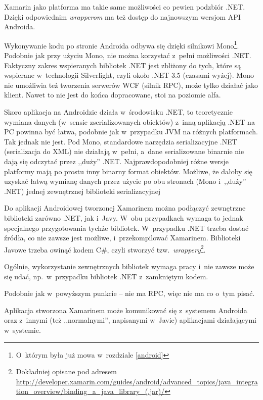 \begin{description}
Xamarin jako platforma ma takie same możliwości co pewien podzbiór .NET\@. Dzięki odpowiednim \emph{wrapperom} ma też dostęp do najnowszym wersjom API Androida.

Wykonywanie kodu po stronie Androida odbywa się dzięki silnikowi Mono\footnote{O~którym była już mowa w~rozdziale \ref{android}}\cite{xamarin-android-arch}.
Podobnie jak przy użyciu Mono\cite{mono-compatibility}, nie można korzystać z~pełni możliwości .NET\cite{xamarin-dot-net}.
Faktyczny zakres wspieranych bibliotek .NET jest zbliżony do tych, które są wspierane w~technologii Silverlight, czyli około .NET 3.5 (czasami wyżej).
Mono nie umożliwia też tworzenia serwerów WCF (silnik RPC), może tylko działać jako klient. Nawet to nie jest do końca dopracowane, stoi na poziomie alfa.

Skoro aplikacja na Androidzie działa w~środowisku .NET, to teoretycznie wymiana danych (w~sensie zserializowanych obiektów) z~inną aplikacją .NET na PC powinna być łatwa, podobnie jak w~przypadku JVM na różnych platformach. Tak jednak nie jest.
Pod Mono, standardowe narzędzia serializacyjne .NET (serializacja do XML) nie działają w~pełni, a~dane serializowane binarnie nie dają się odczytać przez ,,duży'' .NET\@. Najprawdopodobniej różne wersje platformy mają po prostu inny binarny format obiektów.
Możliwe, że dałoby się uzyskać łatwą wymianę danych przez użycie po obu stronach (Mono i~,,duży'' .NET) jednej zewnętrznej biblioteki serializacyjnej

Do aplikacji Androidowej tworzonej Xamarinem można podłączyć zewnętrzne biblioteki zarówno .NET, jak i~Javy.
W~obu przypadkach wymaga to jednak specjalnego przygotowania tychże bibliotek.
W~przypadku .NET trzeba dostać źródła, co nie zawsze jest możliwe, i~przekompilować Xamarinem\cite{xamarin-dot-net}.
Biblioteki Javowe trzeba owinąć kodem C\#, czyli stworzyć tzw.\ \emph{wrappery}\footnote{Dokładniej opisane pod adresem \url{http://developer.xamarin.com/guides/android/advanced_topics/java_integration_overview/binding_a_java_library_(.jar)/}}.

Ogólnie, wykorzystanie zewnętrznych bibliotek wymaga pracy i~nie zawsze może się udać, np.\ w~przypadku bibliotek .NET z~zamkniętym kodem.

Podobnie jak w~powyższym punkcie -- nie ma RPC, więc nie ma co o~tym pisać.

Aplikacja stworzona Xamarinem może komunikować się z~systemem Androida oraz z~innymi (też ,,normalnymi'', napisanymi w~Javie) aplikacjami działającymi w~systemie.


\end{description}

